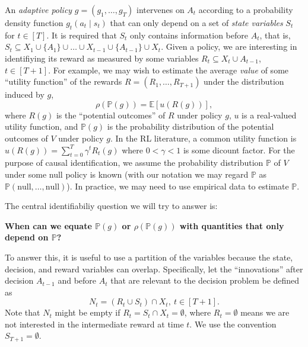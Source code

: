 \documentclass[12pt,a4paper]{article}
\theoremstyle{definition}
\newcommand{\E}[0]{\mathbb{E}}
\newcommand{\PP}[0]{\mathbb{P}}
\begin{document}
An \emph{adaptive
  policy} $g = (g_1,\dots,
g_T)$ intervenes on $A_t$ according to a probability density function
$g_t(a_t \mid s_t)$ that can only depend on a set of \emph{state
  variables} $S_t$ for $t \in [T]$. It is required that $S_t$ only
contains information before $A_t$, that is, $S_t \subseteq X_1 \cup
\{A_1\} \cup \dots \cup X_{t-1} \cup \{A_{t-1}\} \cup X_t$.
Given a policy, we are interesting in identifiying its reward as
measured by some variables $R_t \subseteq X_{t} \cup A_{t-1}$, $t \in [T+1]$.
For example, we may wish to estimate the average \emph{value} of some
``utility function'' of the rewards $R = (R_1,\dots,R_{T+1})$ under the
distribution induced by $g$,
\[
  \rho(\PP(g)) = \E[ u(R(g)) ],
\]
where $R(g)$ is the ``potential outcomes'' of $R$ under policy $g$, $u$
is a real-valued utility function, and $\PP(g)$ is the probability
distribution of the potential outcomes of $V$ under policy $g$. In the
RL literature, a common utility function is $u(R(g)) =
\sum_{t=0}^T \gamma^t R_t(g)$ where $0 < \gamma < 1$ is some dicount
factor. For the purpose of causal identification, we assume
the probability distribution $\PP$ of $V$ under some null
policy is known (with our notation we may regard $\PP$ as
$\PP(\text{null}, \dots,\text{null})$). In practice, we may need to use empirical data to
estimate $\PP$.

The central identifiabiliy question we will try to answer is:
\begin{center} \bf
    When can we equate $\PP(g)$ or $\rho(\PP(g))$ with quantities that
    only depend on $\PP$? %
\end{center}
To answer this, it is useful to use a partition of the variables
because the state, decision, and reward variables can
overlap. Specifically, let the ``innovations'' after decision
$A_{t-1}$ and before $A_t$ that are relevant to the decision problem
be defined as
\begin{equation}
  \label{eq:innovations}
  N_t = (R_t \cup S_t) \cap X_t,~t \in [T+1].
\end{equation}
Note that $N_t$ might be empty if $R_t = S_t \cap X_t =
\emptyset$, where $R_t = \emptyset$ means we are not interested in the
intermediate reward at time $t$. We use the convention $S_{T+1}
=\emptyset$.
\end{document}
